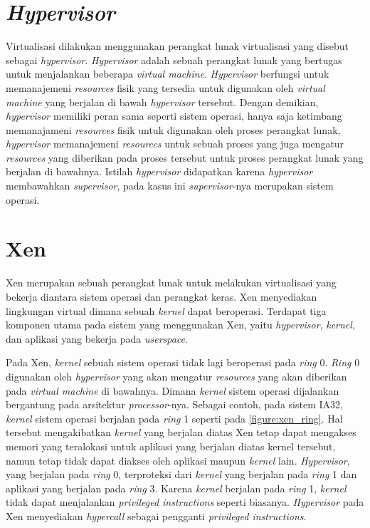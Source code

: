 \section{\textit{Hypervisor}}

Virtualisasi dilakukan menggunakan perangkat lunak virtualisasi yang disebut sebagai \textit{hypervisor}.
\textit{Hypervisor} adalah sebuah perangkat lunak yang bertugas untuk menjalankan beberapa \textit{virtual machine}.
\textit{Hypervisor} berfungsi untuk memanajemeni \textit{resources} fisik yang tersedia untuk digunakan oleh \textit{virtual machine} yang berjalan di bawah \textit{hypervisor} tersebut.
Dengan demikian, \textit{hypervisor} memiliki peran sama seperti sistem operasi, hanya saja ketimbang memanajameni \textit{resources} fisik untuk digunakan oleh proses perangkat lunak, \textit{hypervisor} memanajemeni \textit{resources} untuk sebuah proses yang juga mengatur \textit{resources} yang diberikan pada proses tersebut untuk proses perangkat lunak yang berjalan di bawahnya.
Istilah \textit{hypervisor} didapatkan karena \textit{hypervisor} membawahkan \textit{supervisor}, pada kasus ini \textit{supervisor}-nya merupakan sistem operasi.

\section{Xen}

Xen merupakan sebuah perangkat lunak untuk melakukan virtualisasi yang bekerja diantara sistem operasi dan perangkat keras.
Xen menyediakan lingkungan virtual dimana sebuah \textit{kernel} dapat beroperasi.
Terdapat tiga komponen utama pada sistem yang menggunakan Xen, yaitu \textit{hypervisor}, \textit{kernel}, dan aplikasi yang bekerja pada \textit{userspace}.

Pada Xen, \textit{kernel} sebuah sistem operasi tidak lagi beroperasi pada \textit{ring} 0.
\textit{Ring} 0 digunakan oleh \textit{hypervisor} yang akan mengatur \textit{resources} yang akan diberikan pada \textit{virtual machine} di bawahnya.
Dimana \textit{kernel} sistem operasi dijalankan bergantung pada arsitektur \textit{processor}-nya.
Sebagai contoh, pada sistem IA32, \textit{kernel} sistem operasi berjalan pada \textit{ring} 1 seperti pada \autoref{figure:xen_ring}.
Hal tersebut mengakibatkan \textit{kernel} yang berjalan diatas Xen tetap dapat mengakses memori yang teralokasi untuk aplikasi yang berjalan diatas kernel tersebut, namun tetap tidak dapat diakses oleh aplikasi maupun \textit{kernel} lain.
\textit{Hypervisor}, yang berjalan pada \textit{ring} 0, terproteksi dari \textit{kernel} yang berjalan pada \textit{ring} 1 dan aplikasi yang berjalan pada \textit{ring} 3.
Karena \textit{kernel} berjalan pada \textit{ring} 1, \textit{kernel} tidak dapat menjalankan \textit{privileged instructions} seperti biasanya.
\textit{Hypervisor} pada Xen menyediakan \textit{hypercall} sebagai pengganti \textit{privileged instructions}.

